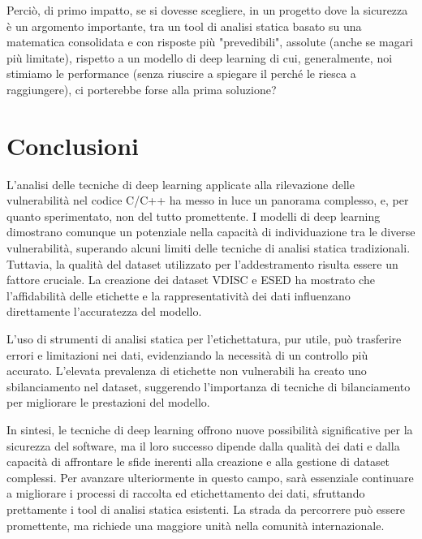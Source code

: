 \documentclass[conference]{IEEEtran}
\begin{document}
Perciò, di primo impatto, se si dovesse scegliere, in un progetto dove la sicurezza è un argomento importante, tra un tool di analisi statica basato su una matematica consolidata e con risposte più "prevedibili", assolute (anche se magari più limitate), rispetto a un modello di deep learning di cui, generalmente, noi stimiamo le performance (senza riuscire a spiegare il perché le riesca a raggiungere), ci porterebbe forse alla prima soluzione?

\section{Conclusioni}

L'analisi delle tecniche di deep learning applicate alla rilevazione delle vulnerabilità nel codice C/C++ ha messo in luce un panorama complesso, e, per quanto sperimentato, non del tutto promettente. I modelli di deep learning dimostrano comunque un potenziale nella capacità di individuazione tra le diverse vulnerabilità, superando alcuni limiti delle tecniche di analisi statica tradizionali. Tuttavia, la qualità del dataset utilizzato per l'addestramento risulta essere un fattore cruciale. La creazione dei dataset VDISC e ESED ha mostrato che l'affidabilità delle etichette e la rappresentatività dei dati influenzano direttamente l'accuratezza del modello.

L'uso di strumenti di analisi statica per l'etichettatura, pur utile, può trasferire errori e limitazioni nei dati, evidenziando la necessità di un controllo più accurato. L'elevata prevalenza di etichette non vulnerabili ha creato uno sbilanciamento nel dataset, suggerendo l'importanza di tecniche di bilanciamento per migliorare le prestazioni del modello.

In sintesi, le tecniche di deep learning offrono nuove possibilità significative per la sicurezza del software, ma il loro successo dipende dalla qualità dei dati e dalla capacità di affrontare le sfide inerenti alla creazione e alla gestione di dataset complessi. Per avanzare ulteriormente in questo campo, sarà essenziale continuare a migliorare i processi di raccolta ed etichettamento dei dati, sfruttando prettamente i tool di analisi statica esistenti. La strada da percorrere può essere promettente, ma richiede una maggiore unità nella comunità internazionale.



\end{document}
